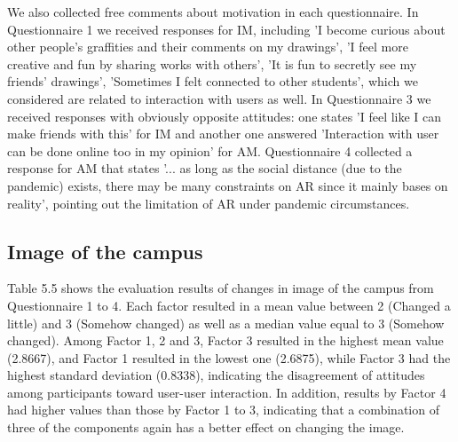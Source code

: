 We also collected free comments about motivation in each questionnaire. In Questionnaire 1 we received responses for IM, including 'I become curious about other people's graffities and their comments on my drawings',
'I feel more creative and fun by sharing works with others', 'It is fun to secretly see my friends' drawings', 'Sometimes I felt connected to other students',
which we considered are related to interaction with users as well.
In Questionnaire 3 we received responses with obviously opposite attitudes: one states 'I feel like I can make friends with this' for IM and another one answered 'Interaction with user can be done online too in my opinion' for AM.
Questionnaire 4 collected a response for AM that states '... as long as the social distance (due to the pandemic) exists, there may be many constraints on AR since it mainly bases on reality',
pointing out the limitation of AR under pandemic circumstances.

\subsection{Image of the campus}

Table 5.5 shows the evaluation results of changes in image of the campus from Questionnaire 1 to 4.
Each factor resulted in a mean value between 2 (Changed a little) and 3 (Somehow changed) as well as a median value equal to 3 (Somehow changed).
Among Factor 1, 2 and 3, Factor 3 resulted in the highest mean value (2.8667), and Factor 1 resulted in the lowest one (2.6875),
while Factor 3 had the highest standard deviation (0.8338), indicating the disagreement of attitudes among participants toward user-user interaction.
In addition, results by Factor 4 had higher values than those by Factor 1 to 3, indicating that a combination of three of the components again has a better effect on changing the image.

